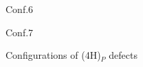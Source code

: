 \documentclass[11pt]{article}
\begin{document}
\begin{figure}[H]
\begin{minipage}[h]{0.3\linewidth}
\end{minipage}
\hfill
\begin{minipage}[h]{0.3\linewidth}
 Conf.6 \\
\end{minipage}
\vfill
\begin{minipage}[h]{0.3\linewidth}
\end{minipage}
\hfill
\begin{minipage}[h]{0.9\linewidth}
 Conf.7 \\
\end{minipage}
\caption{Configurations of (4H)$_{P}$ defects}
\label{pvac7}
\end{figure}
\end{document}
